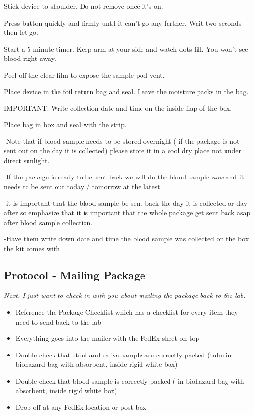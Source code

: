 \documentclass[]{book}
\begin{document}
Stick device to shoulder. Do not remove once it's on.

Press button quickly and firmly until it can't go any farther. Wait two seconds then let go.

Start a 5 minute timer. Keep arm at your side and watch dots fill. You won't see blood right away.

Peel off the clear film to expose the sample pod vent.

Place device in the foil return bag and seal. Leave the moisture packs in the bag.

IMPORTANT: Write collection date and time on the inside flap of the box.

Place bag in box and seal with the strip.

-Note that if blood sample needs to be stored overnight ( if the package is not sent out on the day it is collected) please store it in a cool dry place not under direct sunlight.

-If the package is ready to be sent back we will do the blood sample \emph{now} and it needs to be sent out today / tomorrow at the latest

-it is important that the blood sample be sent back the day it is collected or day after so emphasize that it is important that the whole package get sent back asap after blood sample collection.

-Have them write down date and time the blood sample was collected on the box the kit comes with

\hypertarget{protocol---mailing-package-3}{%
\subsection{Protocol - Mailing Package}\label{protocol---mailing-package-3}}

\emph{Next, I just want to check-in with you about mailing the package back to the lab.}

\begin{itemize}
\item
  Reference the Package Checklist which has a checklist for every item they need to send back to the lab
\item
  Everything goes into the mailer with the FedEx sheet on top
\item
  Double check that stool and saliva sample are correctly packed (tube in biohazard bag with absorbent, inside rigid white box)
\item
  Double check that blood sample is correctly packed ( in biohazard bag with absorbent, inside rigid white box)
\item
  Drop off at any FedEx location or post box
\end{itemize}
\end{document}
